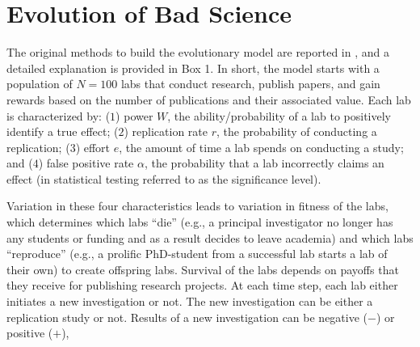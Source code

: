 \documentclass[meta, authordate,issue]{jote-new-article}
\begin{document}
\section{Evolution of Bad Science}






The original methods to build the evolutionary model are reported in \textcite{SmaldinoMcelreath2016}, and a detailed explanation is provided in Box 1. In short, the model starts with a population of $N=100$ labs that conduct research, publish papers, and gain rewards based on the number of publications and their associated value. Each lab is characterized by: ($1$) power $W$, the ability/probability of a lab to positively identify a true effect; ($2$) replication rate $r$, the probability of conducting a replication; ($3$) effort $e$, the amount of time a lab spends on conducting a study; and ($4$) false positive rate $\alpha$, the probability that a lab incorrectly claims an effect (in statistical testing referred to as the significance level).


Variation in these four characteristics leads to variation in fitness of the labs, which determines which labs ``die'' (e.g., a principal investigator no longer has any students or funding and as a result decides to leave academia) and which labs ``reproduce'' (e.g., a prolific PhD-student from a successful lab starts a lab of their own) to create offspring labs. Survival of the labs depends on payoffs that they receive for publishing research projects. At each time step, each lab either initiates a new investigation or not. The new investigation can be either a replication study or not. Results of a new investigation can be negative ($-$) or positive ($+$),\newpage
\end{document}
